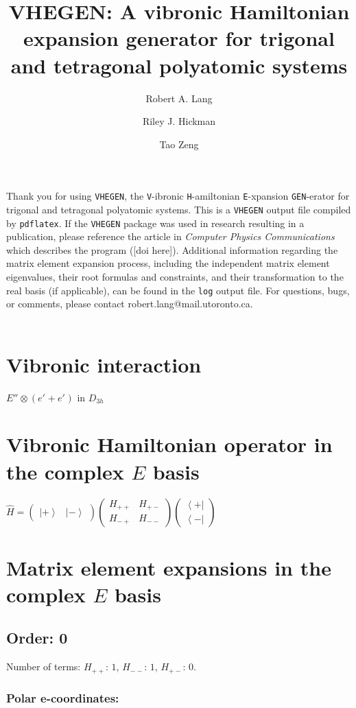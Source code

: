 \documentclass[fleqn]{article}
\title{VHEGEN: A vibronic Hamiltonian expansion generator for trigonal and tetragonal polyatomic systems}
\author{Robert A. Lang \and Riley J. Hickman \and Tao Zeng}
\date{}
\begin{document}
\maketitle
Thank you for using \texttt{VHEGEN}, the \texttt{V}-ibronic \texttt{H}-amiltonian \texttt{E}-xpansion \texttt{GEN}-erator for trigonal and tetragonal polyatomic systems. This is a \texttt{VHEGEN} output file compiled by \texttt{pdflatex}. If the \texttt{VHEGEN} package was used in research resulting in a publication, please reference the article in \textit{Computer Physics Communications} which describes the program ([doi here]). Additional information regarding the matrix element expansion process, including the independent matrix element eigenvalues, their root formulas and constraints, and their transformation to the real basis (if applicable), can be found in the \texttt{log} output file. For questions, bugs, or comments, please contact robert.lang@mail.utoronto.ca.\\\\
\tableofcontents
\newpage
\section{Vibronic interaction}
$E''_{} \otimes (e'_{}+e'_{})$ in $D_{3h}$
\section{Vibronic Hamiltonian operator in the complex $E$ basis}
$\hat{H}=\left(\begin{matrix}{\left|+\right\rangle } & {\left|-\right\rangle }\end{matrix}\right) \left(\begin{matrix}H_{++} & H_{+-}\\H_{-+} & H_{--}\end{matrix}\right) \left(\begin{matrix}{\left\langle +\right|}\\{\left\langle -\right|}\end{matrix}\right)$
\section{Matrix element expansions in the complex $E$ basis}
\subsection{Order: 0}
Number of terms: $H_{++}$: $1$, $H_{--}$: $1$, $H_{+-}$: $0$.
\subsubsection*{Polar e-coordinates:}
\end{document}
